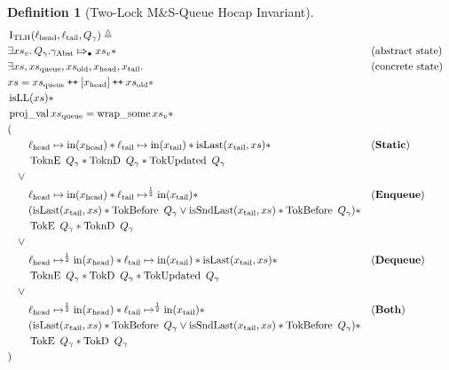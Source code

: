 \documentclass[a4paper, 10pt]{report}
\theoremstyle{definition}
\newtheorem{definition}{Definition}[section]
\newcommand{\msq}{M\&S-Queue\xspace}
\newcommand{\tlmsq}{Two-Lock \msq}
\newcommand{\TLQueueInvariantHocap}{\operatorname{I_{TLH}}}
\newcommand{\xsc}{xs}
\newcommand{\xsqueue}{xs_{\mathrm{queue}}}
\newcommand{\xsold}{xs_{\mathrm{old}}}
\newcommand{\isLL}{\operatorname{isLL}}
\newcommand{\projval}{\operatorname{proj\_val}}
\newcommand{\wrapsome}{\operatorname{wrap\_some}}
\newcommand{\isLast}{\operatorname{isLast}}
\newcommand{\isSndLast}{\operatorname{isSndLast}}
\newcommand{\locN}[1]{\loc_{\mathrm{#1}}}
\newcommand{\lochead}{\locN{head}}
\newcommand{\loctail}{\locN{tail}}
\newcommand{\nIn}[1]{\operatorname{in}(#1)}
\newcommand{\node}{x}
\newcommand{\nodeN}[1]{\node_{\mathrm{#1}}}
\newcommand{\nodehead}{\nodeN{head}}
\newcommand{\nodetail}{\nodeN{tail}}
\newcommand{\absvalueList}{xs_v}
\newcommand{\StaticState}{\textbf{Static}}
\newcommand{\EnqueueState}{\textbf{Enqueue}}
\newcommand{\DequeueState}{\textbf{Dequeue}}
\newcommand{\BothState}{\textbf{Both}}
\newcommand{\Qg}{Q_\gname}
\newcommand{\gabst}{\gname_{\mathrm{Abst}}}
\newcommand{\TokE}[1]{\operatorname{TokE} ~ #1}
\newcommand{\TokEQg}{\TokE{\Qg}}
\newcommand{\ToknE}[1]{\operatorname{ToknE} ~ #1}
\newcommand{\ToknEQg}{\ToknE{\Qg}}
\newcommand{\TokD}[1]{\operatorname{TokD} ~ #1}
\newcommand{\TokDQg}{\TokD{\Qg}}
\newcommand{\ToknD}[1]{\operatorname{ToknD} ~ #1}
\newcommand{\ToknDQg}{\ToknD{\Qg}}
\newcommand{\TokBefore}[1]{\operatorname{TokBefore} ~ #1}
\newcommand{\TokBeforeQg}{\TokBefore{\Qg}}
\newcommand{\TokAfterQg}{\TokBefore{\Qg}}
\newcommand{\TokUpdated}[1]{\operatorname{TokUpdated} ~ #1}
\newcommand{\TokUpdatedQg}{\TokUpdated{\Qg}}
\newcommand\catenate{\mathbin{\text{\ttfamily\upshape ++}}}
\newcommand{\abstractstateauth}[2]{#1 \Mapsto_{\bullet} #2}
\begin{document}
\begin{definition}[\tlmsq Hocap Invariant]\label{TLMSQ:spec:hocap:invariant}
  \begin{align*}
    &\TLQueueInvariantHocap(\lochead, \loctail, \Qg) \eqdef\\
    &\Exists \absvalueList. \abstractstateauth{\Qg.\gabst}{\absvalueList} \star &&\text{(abstract state)}\\
    &\Exists \xsc, \xsqueue, \xsold, \nodehead, \nodetail . &&\text{(concrete state)}\\
    &\xsc = \xsqueue \catenate [\nodehead] \catenate \xsold \star\\
    &\isLL(\xsc) \star\\
    &\projval \xsqueue = \wrapsome \absvalueList \star\\
    &(\\
    &\quad\quad\lochead \mapsto \nIn{\nodehead} \star \loctail \mapsto \nIn{\nodetail} \star \isLast(\nodetail, \xsc) \star &&\text{(\StaticState)}\\
    &\quad\quad \ToknEQg \star \ToknDQg \star \TokUpdatedQg\\
    &\quad\lor\\
    &\quad\quad\lochead \mapsto \nIn{\nodehead} \star \loctail \mapsto^{\frac{1}{2}} \nIn{\nodetail} \star &&\text{(\EnqueueState)}\\
    &\quad\quad (\isLast(\nodetail, \xsc) \star \TokBeforeQg \lor \isSndLast(\nodetail, \xsc) \star \TokAfterQg) \star\\
    &\quad\quad \TokEQg \star \ToknDQg\\
    &\quad\lor\\
    &\quad\quad\lochead \mapsto^{\frac{1}{2}} \nIn{\nodehead} \star \loctail \mapsto \nIn{\nodetail} \star \isLast(\nodetail, \xsc) \star &&\text{(\DequeueState)}\\
    &\quad\quad \ToknEQg \star \TokDQg \star \TokUpdatedQg\\
    &\quad\lor\\
    &\quad\quad\lochead \mapsto^{\frac{1}{2}} \nIn{\nodehead} \star \loctail \mapsto^{\frac{1}{2}} \nIn{\nodetail} \star &&\text{(\BothState)}\\
    &\quad\quad (\isLast(\nodetail, \xsc) \star \TokBeforeQg \lor \isSndLast(\nodetail, \xsc) \star \TokAfterQg) \star \\
    &\quad\quad \TokEQg \star \TokDQg\\
    &)
  \end{align*}
\end{definition}
\end{document}
